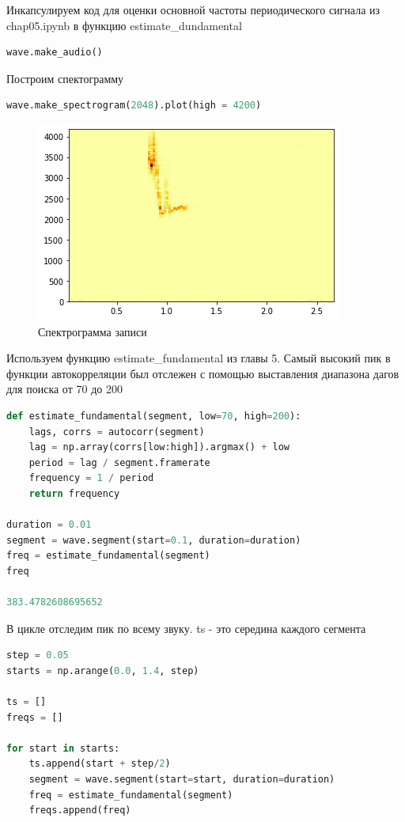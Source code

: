 Инкапсулируем код для оценки основной частоты периодического сигнала из chap05.ipynb в функцию estimate_dundamental

\begin{lstlisting}[language=Python]
wave.make_audio()
\end{lstlisting}

Построим спектограмму

\begin{lstlisting}[language=Python]
wave.make_spectrogram(2048).plot(high = 4200)
\end{lstlisting}

\begin{figure}[H]
	\begin{center}
		\includegraphics[scale=1]{fig/lab05/lab05_03.png}
		\caption{Спектрограмма записи}
	\end{center}
\end{figure}

Используем функцию estimate_fundamental из главы 5. Самый высокий пик в функции автокорреляции был отслежен с помощью выставления диапазона дагов для поиска от 70 до 200

\begin{lstlisting}[language=Python]
def estimate_fundamental(segment, low=70, high=200):
    lags, corrs = autocorr(segment)
    lag = np.array(corrs[low:high]).argmax() + low
    period = lag / segment.framerate
    frequency = 1 / period
    return frequency
    
duration = 0.01
segment = wave.segment(start=0.1, duration=duration)
freq = estimate_fundamental(segment)
freq

383.4782608695652
\end{lstlisting}

В цикле отследим пик по всему звуку. ts - это середина каждого сегмента

\begin{lstlisting}[language=Python]
step = 0.05
starts = np.arange(0.0, 1.4, step)

ts = []
freqs = []

for start in starts:
    ts.append(start + step/2)
    segment = wave.segment(start=start, duration=duration)
    freq = estimate_fundamental(segment)
    freqs.append(freq)
\end{lstlisting}

